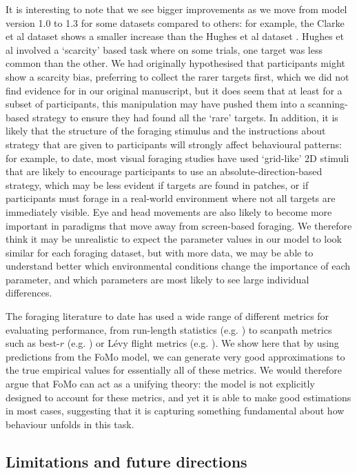 \documentclass[man, floatsintext]{apa7}
\begin{document}
It is interesting to note that we see bigger improvements as we move from model version 1.0 to 1.3 for some datasets compared to others: for example, the Clarke et al dataset \cite{clarke2022qjep} shows a smaller increase than the Hughes et al dataset \cite{hughes2024}. Hughes et al \cite{hughes2024} involved a `scarcity' based task where on some trials, one target was less common than the other. We had originally hypothesised that participants might show a scarcity bias, preferring to collect the rarer targets first, which we did not find evidence for in our original manuscript, but it does seem that at least for a subset of participants, this manipulation may have pushed them into a scanning-based strategy to ensure they had found all the `rare' targets. In addition, it is likely that the structure of the foraging stimulus and the instructions about strategy that are given to participants will strongly affect behavioural patterns: for example, to date, most visual foraging studies have used `grid-like' 2D stimuli that are likely to encourage participants to use an absolute-direction-based strategy, which may be less evident if targets are found in patches, or if participants must forage in a real-world environment where not all targets are immediately visible. Eye and head movements are also likely to become more important in paradigms that move away from screen-based foraging. We therefore think it may be unrealistic to expect the parameter values in our model to look similar for each foraging dataset, but with more data, we may be able to understand better which environmental conditions change the importance of each parameter, and which parameters are most likely to see large individual differences.

The foraging literature to date has used a wide range of different metrics for evaluating performance, from run-length statistics (e.g. \cite{kristjansson2014}) to scanpath metrics such as best-$r$ (e.g. \cite{olafsdottir2021, bella2025one}) or L\'evy flight metrics (e.g. \cite{edwards2008using}). We show here that by using predictions from the FoMo model, we can generate very good approximations to the true empirical values for essentially all of these metrics. We would therefore argue that FoMo can act as a unifying theory: the model is not explicitly designed to account for these metrics, and yet it is able to make good estimations in most cases, suggesting that it is capturing something fundamental about how behaviour unfolds in this task. 

\subsection{Limitations and future directions}
\end{document}

